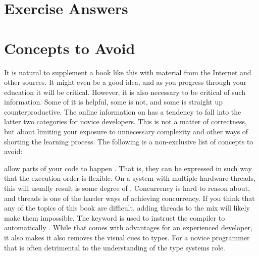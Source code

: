 \chapter{Exercise Answers}


\chapter{Concepts to Avoid}

It is natural to supplement a book like this with material from the Internet and other sources. It might even be a good idea, and as you progress through your education it will be critical. However, it is also necessary to be critical of such information. Some of it is helpful, some is not, and some is straight up counterproductive. The online information on \csharp has a tendency to fall into the latter two categories for novice developers. This is not a matter of correctness, but about limiting your exposure to unnecessary complexity and other ways of shorting the learning process. The following is a non-exclusive list of concepts to avoid:

\begin{itemize}
    allow parts of your code to happen . That is, they can be expressed in such way that the execution order is flexible. On a system with multiple hardware threads, this will usually result is some degree of . Concurrency is hard to reason about, and threads is one of the harder ways of achieving concurrency. If you think that any of the topics of this book are difficult, adding threads to the mix will likely make them impossible.
   The  keyword is used to instruct the compiler to automatically . While that comes with advantages for an experienced developer, it also makes it also removes the visual cues to types. For a novice programmer that is often detrimental to the understanding of the type systems role.
\end{itemize}

\printbibliography
\printindex

